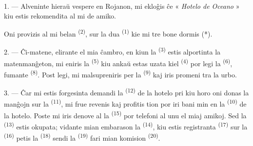 %


\VUsaut{3.0mm}
\VUsaut{1.6mm}
\VUsaut{2.0mm}
\VUsaut{3.4mm}

1. --- Alveninte hieraŭ vespere en Rojanon, mi ekloĝis ĉe « \textit{Hotelo de
Oceano} » kiu estis rekomendita al mi de amiko.

Oni provizis al mi belan  \textsuperscript{(2)}, sur la dua
 \textsuperscript{(1)} kie mi tre bone dormis (*).

2. --- Ĉi-matene, elirante el mia ĉambro, en kiun la 
\textsuperscript{(3)} estis alportinta la matenmanĝeton, mi eniris la
 \textsuperscript{(5)} kiu ankaŭ estas uzata kiel
 \textsuperscript{(4)} por legi la 
\textsuperscript{(6)}, fumante  \textsuperscript{(8)}. Post
legi, mi malsupreniris per la  \textsuperscript{(9)} kaj iris
promeni tra la urbo.

3. --- Ĉar mi estis forgesinta demandi la 
\textsuperscript{(12)} de la hotelo pri kiu horo oni donas la manĝojn sur la
 \textsuperscript{(11)}, mi frue revenis kaj profitis tion
por iri bani min en la  \textsuperscript{(10)} de la hotelo.
Poste mi iris denove al la  \textsuperscript{(15)} por telefoni
al unu el miaj amikoj. Sed la  \textsuperscript{(13)} estis
okupata; vidante mian embarason la  \textsuperscript{(14)},
kiu estis registranta  \textsuperscript{(17)} sur la
 \textsuperscript{(16)} petis la 
\textsuperscript{(18)} sendi la  \textsuperscript{(19)} fari mian
komision  \textsuperscript{(20)}.


